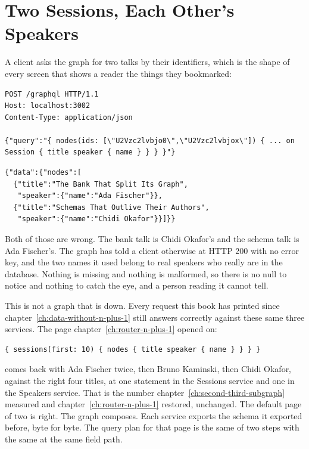 \section{Two Sessions, Each Other's Speakers}
\label{sec:ch11-two-sessions-each-others-speakers}

%
A client asks the graph for two talks by their identifiers, which is the shape
of every screen that shows a reader the things they bookmarked:

\begin{verbatim}
POST /graphql HTTP/1.1
Host: localhost:3002
Content-Type: application/json

{"query":"{ nodes(ids: [\"U2Vzc2lvbjo0\",\"U2Vzc2lvbjox\"]) { ... on Session { title speaker { name } } } }"}
\end{verbatim}

\begin{verbatim}
{"data":{"nodes":[
  {"title":"The Bank That Split Its Graph",
   "speaker":{"name":"Ada Fischer"}},
  {"title":"Schemas That Outlive Their Authors",
   "speaker":{"name":"Chidi Okafor"}}]}}
\end{verbatim}

%
Both of those are wrong. The bank talk is Chidi Okafor's and the schema talk is
Ada Fischer's. The graph has told a client otherwise at HTTP 200 with no error
key, and the two names it used belong to real speakers who really are in the
database. Nothing is missing and nothing is malformed, so there is no null to
notice and nothing to catch the eye, and a person reading it cannot tell.

%
This is not a graph that is down. Every request this book has printed since
chapter~\ref{ch:data-without-n-plus-1} still answers correctly against these
same three services. The page chapter~\ref{ch:router-n-plus-1} opened on:

\begin{verbatim}
{ sessions(first: 10) { nodes { title speaker { name } } } }
\end{verbatim}

%
comes back with Ada Fischer twice, then Bruno Kaminski, then Chidi Okafor,
against the right four titles, at one statement in the Sessions service and one
in the Speakers service. That is the number
chapter~\ref{ch:second-third-subgraph} measured and
chapter~\ref{ch:router-n-plus-1} restored, unchanged. The default page of two
is right. The graph composes. Each service exports the schema it exported
before, byte for byte. The query plan for that page is the same
 of two steps with the same  at the same field
path.

